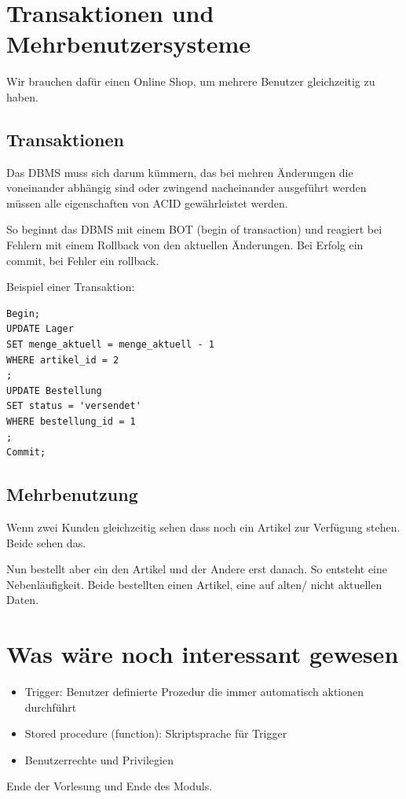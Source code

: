 \documentclass[a4paper]{article}
\title{\docTitle}
\author{Moritz}
\date{\today}
\begin{document}
\maketitle
\tableofcontents


\section{Transaktionen und Mehrbenutzersysteme}

Wir brauchen dafür einen Online Shop, um mehrere Benutzer gleichzeitig zu haben.

\subsection{Transaktionen}

Das DBMS muss sich darum kümmern, das bei mehren Änderungen die voneinander abhängig sind oder zwingend nacheinander ausgeführt werden müssen alle eigenschaften von ACID gewährleistet werden.

So beginnt das DBMS mit einem BOT (begin of transaction) und reagiert bei Fehlern mit einem Rollback von den aktuellen Änderungen. Bei Erfolg ein commit, bei Fehler ein rollback.

Beispiel einer Transaktion:

\begin{lstlisting}
Begin;
UPDATE Lager
SET menge_aktuell = menge_aktuell - 1
WHERE artikel_id = 2
;
UPDATE Bestellung
SET status = 'versendet'
WHERE bestellung_id = 1
;
Commit;
\end{lstlisting}

\subsection{Mehrbenutzung}

Wenn zwei Kunden gleichzeitig sehen dass noch ein Artikel zur Verfügung stehen. Beide sehen das.

Nun bestellt aber ein den Artikel und der Andere erst danach. So entsteht eine Nebenläufigkeit. Beide bestellten einen Artikel, eine auf alten/ nicht aktuellen Daten.

\section{Was wäre noch interessant gewesen}

\begin{itemize}
    \item Trigger: Benutzer definierte Prozedur die immer automatisch aktionen durchführt
    \item Stored procedure (function): Skriptsprache für Trigger
    \item Benutzerrechte und Privilegien
\end{itemize}

Ende der Vorlesung und Ende des Moduls.
\end{document}
